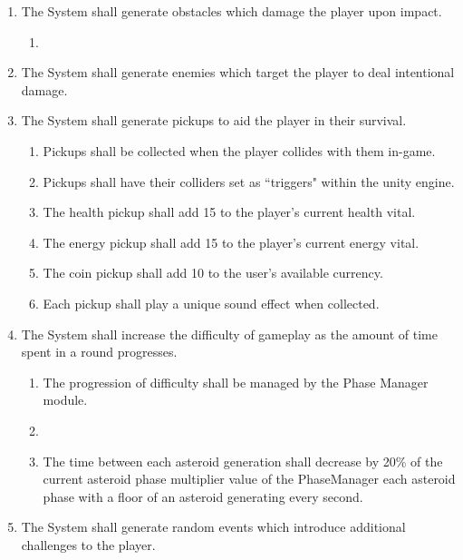 \documentclass[12pt]{report}
\newenvironment{reqlist}{
	\renewcommand{\labelenumi}{\tab\thesubsection.\arabic{enumi}}
	\renewcommand{\labelenumii}{\thesubsection.\arabic{enumi}.\arabic{enumii}}
	\begin{enumerate}[itemsep = 1pt, parsep = 0pt, leftmargin = *]
}{\end{enumerate}}
\begin{document}
\begin{reqlist}
\begin{reqlist}
				\item The System shall include a minimum of two alternative weapons in addition to the standard laser.
				\item The System shall make the additional weapons available in the in-game store.
			\end{reqlist}
			\item The System shall generate obstacles which damage the player upon impact.
			\begin{reqlist}
				\item 
			\end{reqlist}
			\item The System shall generate enemies which target the player to deal intentional damage.
			\item The System shall generate pickups to aid the player in their survival.
			\begin{reqlist}
				\item Pickups shall be collected when the player collides with them in-game.
				\item Pickups shall have their colliders set as ``triggers" within the unity engine.
				\item The health pickup shall add 15 to the player's current health vital.
				\item The energy pickup shall add 15 to the player's current energy vital.
				\item The coin pickup shall add 10 to the user's available currency.
				\item Each pickup shall play a unique sound effect when collected.
			\end{reqlist}
			\item The System shall increase the difficulty of gameplay as the amount of time spent in a round progresses.
			\begin{reqlist}
				\item The progression of difficulty shall be managed by the Phase Manager module.
				\item 
				\item The time between each asteroid generation shall decrease by 20\% of the current asteroid phase multiplier value of the PhaseManager each asteroid phase with a floor of an asteroid generating every second.
			\end{reqlist}
			\item The System shall generate random events which introduce additional challenges to the player.
			\begin{reqlist}

\end{reqlist}
\end{reqlist}
\end{document}
